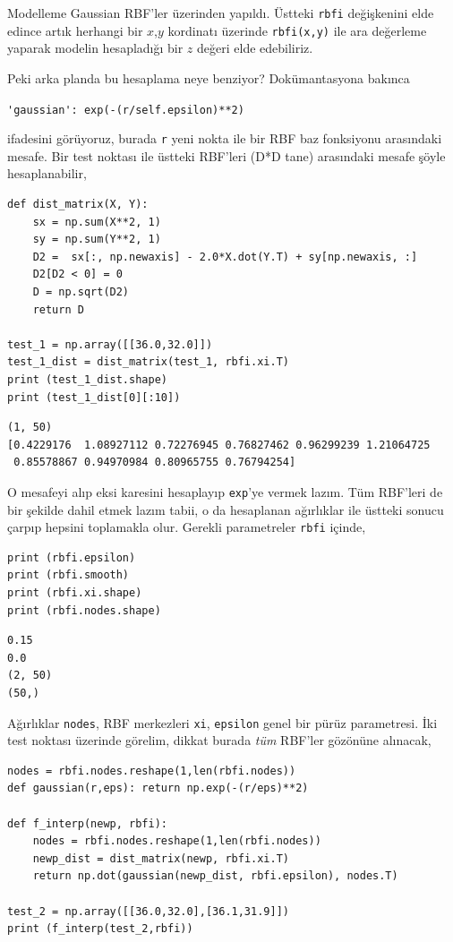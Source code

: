 \documentclass[12pt,fleqn]{article}\usepackage{../../common}
\begin{document}
Modelleme Gaussian RBF'ler üzerinden yapıldı. Üstteki \verb!rbfi! değişkenini
elde edince artık herhangi bir $x$,$y$ kordinatı üzerinde \verb!rbfi(x,y)!
ile ara değerleme yaparak modelin hesapladığı bir $z$ değeri elde edebiliriz.

Peki arka planda bu hesaplama neye benziyor?  Dokümantasyona bakınca

\verb!'gaussian': exp(-(r/self.epsilon)**2)!

ifadesini görüyoruz, burada \verb!r! yeni nokta ile bir RBF baz fonksiyonu
arasındaki mesafe. Bir test noktası ile üstteki RBF'leri (D*D tane)
arasındaki mesafe şöyle hesaplanabilir,

\begin{verbatim}
def dist_matrix(X, Y):
    sx = np.sum(X**2, 1)
    sy = np.sum(Y**2, 1)
    D2 =  sx[:, np.newaxis] - 2.0*X.dot(Y.T) + sy[np.newaxis, :] 
    D2[D2 < 0] = 0
    D = np.sqrt(D2)
    return D
    
test_1 = np.array([[36.0,32.0]])
test_1_dist = dist_matrix(test_1, rbfi.xi.T)
print (test_1_dist.shape)
print (test_1_dist[0][:10])
\end{verbatim}

\begin{verbatim}
(1, 50)
[0.4229176  1.08927112 0.72276945 0.76827462 0.96299239 1.21064725
 0.85578867 0.94970984 0.80965755 0.76794254]
\end{verbatim}

O mesafeyi alıp eksi karesini hesaplayıp \verb!exp!'ye vermek lazım. Tüm
RBF'leri de bir şekilde dahil etmek lazım tabii, o da hesaplanan ağırlıklar
ile üstteki sonucu çarpıp hepsini toplamakla olur. Gerekli parametreler
\verb!rbfi! içinde,

\begin{verbatim}
print (rbfi.epsilon)
print (rbfi.smooth)
print (rbfi.xi.shape)
print (rbfi.nodes.shape)
\end{verbatim}

\begin{verbatim}
0.15
0.0
(2, 50)
(50,)
\end{verbatim}

Ağırlıklar \verb!nodes!, RBF merkezleri \verb!xi!, \verb!epsilon! genel bir
pürüz parametresi. İki test noktası üzerinde görelim, dikkat burada {\em
  tüm} RBF'ler gözönüne alınacak,

\begin{verbatim}
nodes = rbfi.nodes.reshape(1,len(rbfi.nodes))
def gaussian(r,eps): return np.exp(-(r/eps)**2)

def f_interp(newp, rbfi):
    nodes = rbfi.nodes.reshape(1,len(rbfi.nodes))
    newp_dist = dist_matrix(newp, rbfi.xi.T)
    return np.dot(gaussian(newp_dist, rbfi.epsilon), nodes.T)

test_2 = np.array([[36.0,32.0],[36.1,31.9]])
print (f_interp(test_2,rbfi))
\end{verbatim}
\end{document}

